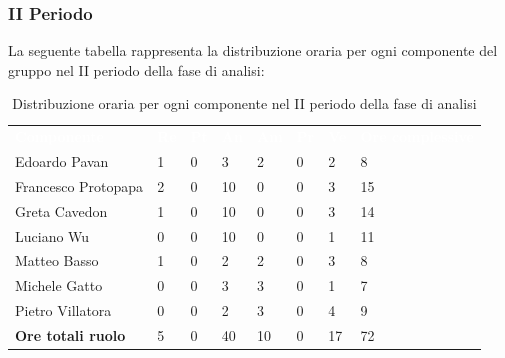 \subsubsection{II Periodo}
La seguente tabella rappresenta la distribuzione oraria per ogni componente del gruppo nel II periodo della fase di analisi:
\begin{table}[!htbp]
\begin{center}
\renewcommand{\arraystretch}{1.25}
\begin{tabular}{ m{}<{\centering}  m{}<{\centering} m{}<{\centering} m{}<{\centering}  m{}<{\centering}  m{}<{\centering}  m{}<{\centering}  m{}<{\centering}   }
	\rowcolor{darkblue}
	\textcolor{white}{\textbf{Componente}} &\textcolor{white}{\textbf{Re}}&\textcolor{white}{\textbf{Pt}}&\textcolor{white}{\textbf{An}}&\textcolor{white}{\textbf{Am}}&\textcolor{white}{\textbf{Pr}}&\textcolor{white}{\textbf{Ve}}&\textcolor{white}{\textbf{Ore complessive}}\\ 
	Edoardo Pavan & 1 & 0 & 3 & 2 & 0 & 2 & 8 \\	
	
	Francesco Protopapa & 2 & 0 & 10 & 0 & 0 & 3 & 15 \\

	Greta Cavedon & 1 & 0 & 10 & 0 & 0 & 3 & 14 \\
	
	Luciano Wu & 0 & 0 & 10 & 0 & 0 & 1 & 11 \\
	
	Matteo Basso & 1 & 0 & 2 & 2 & 0 & 3 & 8 \\
	
	Michele Gatto &  0 & 0 & 3 & 3 & 0 & 1 & 7 \\
	
	Pietro Villatora & 0 & 0 & 2 & 3 & 0 & 4 & 9 \\
	
	\textbf{Ore totali ruolo} & 5 & 0 & 40 & 10 & 0 & 17 & 72\\

\end{tabular}
\caption{Distribuzione oraria per ogni componente nel II periodo della fase di analisi}
\end{center}
\end{table}

